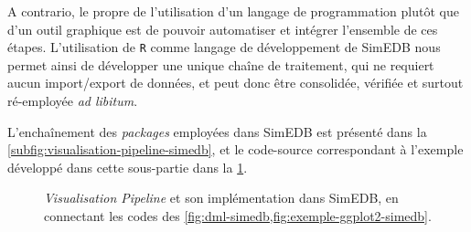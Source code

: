 A contrario, le propre de l'utilisation d'un langage de programmation plutôt que d'un outil graphique est de pouvoir automatiser et intégrer l'ensemble de ces étapes.
L'utilisation de \texttt{R} comme langage de développement de SimEDB nous permet ainsi de développer une unique chaîne de traitement, qui ne requiert aucun import/export de données, et peut donc être consolidée, vérifiée et surtout ré-employée \textit{ad libitum}.

L'enchaînement des \textit{packages} employées dans SimEDB est présenté dans la \cref{subfig:visualisation-pipeline-simedb}, et le code-source correspondant à l'exemple développé dans cette sous-partie dans la \cref{fig:visualisation-pipeline-exemple}.

\begin{figure}[H]
\centering
\hspace{5pt}
\hspace{5pt}
\hspace{5pt}
\caption{\og \textit{Visualisation Pipeline}\fg{} et son implémentation dans SimEDB, en \og connectant\fg{} les codes des \cref{fig:dml-simedb,fig:exemple-ggplot2-simedb}.}
\label{fig:visualisation-pipeline-exemple}
\end{figure}

